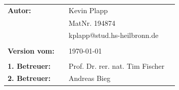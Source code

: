 \begin{titlepage}
\begin{verbatim}
\end{verbatim}
\begin{flushleft}
\begin{tabular}{llll}
\textbf{Autor:} 		& & Kevin Plapp 							& \\
		 				& & MatNr. 194874 							& \\
		 				& & kplapp@stud.hs-heilbronn.de				& \\
		 				& & \\
\textbf{Version vom:}	& & \today 									&\\
						& & \\
\textbf{1. Betreuer:} 	& & Prof. Dr. rer. nat. Tim Fischer 		&\\
\textbf{2. Betreuer:}	& & Andreas Bieg 							&\\
\end{tabular}
\end{flushleft}
\end{titlepage}